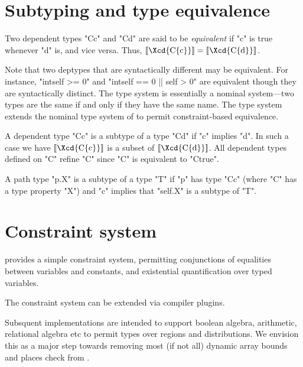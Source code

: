 \section{Subtyping and type equivalence}\label{DepType:Equivalence}\label{deptype,equivalence}

Two dependent types \xcd"C{c}" and \xcd"C{d}" are said to be {\em equivalent} if 
\xcd"c" is true whenever \xcd"d" is, and vice versa. Thus, 
$\LL{\mbox{\Xcd{C\{c\}}}} = \LL{\mbox{\Xcd{C\{d\}}}}$.

Note that two deptypes that are syntactically different may be
equivalent. For instance, \xcd"int{self >= 0}" and
\xcd"int{self == 0 || self > 0}" are equivalent though they are syntactically
distinct. The \Java{} type system is essentially a nominal system---two
types are the same if and only if they have the same name. The \Xten{}
type system extends the nominal type system of \Java{} to permit
constraint-based equivalence.

A dependent type \xcd"C{c}" is a subtype of a type \xcd"C{d}" if
\xcd"c" implies \xcd"d".  In such a case we have
$\LL{\mbox{\Xcd{C\{c\}}}}$ is a
subset of $\LL{\mbox{\Xcd{C\{d\}}}}$. All dependent types defined on \xcd"C" refine
\xcd"C" since \xcd"C" is equivalent to \xcd"C{true}".


A path type \xcd"p.X" is a subtype of a type \xcd"T" if
\xcd"p" has type \xcd"C{c}" (where \xcd"C" has a type property
\xcd"X") and \xcd"c" implies that \xcd"self.X" is a subtype of \xcd"T".


\section{Constraint system}

\Xten{} provides a simple constraint system,  
permitting conjunctions of equalities between variables and
constants, and existential quantification over typed variables.

The constraint system can be extended via compiler plugins.

Subsquent implementations are intended to support boolean algebra,
arithmetic, relational algebra etc to permit types over regions and
distributions. We envision this as a major step towards removing most
(if not all) dynamic array bounds and places check from \Xten{}.







